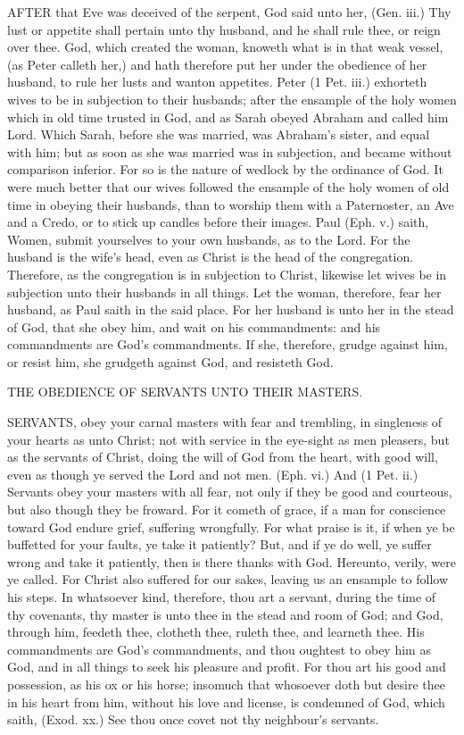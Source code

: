 AFTER that Eve was deceived of the serpent, God said 
unto her, (Gen. iii.) Thy lust or appetite shall pertain 
unto thy husband, and he shall rule thee, or reign over
thee. God, which created the woman, knoweth what is
in that weak vessel, (as Peter calleth her,) and hath therefore
put her under the obedience of her husband, to rule her 
lusts and wanton appetites. Peter (1 Pet. iii.) exhorteth 
wives to be in subjection to their husbands; after the ensample
of the holy women which in old time trusted in 
God, and as Sarah obeyed Abraham and called him 
Lord. Which Sarah, before she was married, was
Abraham's sister, and equal with him; but as 
soon as she was married was in subjection, and became 
without comparison inferior. For so is the nature of 
wedlock by the ordinance of God. It were much better 
that our wives followed the ensample of the holy women of 
old time in obeying their husbands, than to worship them 
with a Paternoster, an Ave and a Credo, or to stick up 
candles before their images. Paul (Eph. v.) saith, Women, 
submit yourselves to your own husbands, as to the
Lord. For the husband is the wife's head, even as Christ is 
the head of the congregation. Therefore, as the congregation 
is in subjection to Christ, likewise let wives be in subjection
unto their husbands in all things. Let the woman, 
therefore, fear her husband, as Paul saith in the said place. 
For her husband is unto her in the stead of God, that she 
obey him, and wait on his commandments: and his commandments
are God's commandments. If she, therefore, 
grudge against him, or resist him, she grudgeth against 
God, and resisteth God.


THE OBEDIENCE OF SERVANTS UNTO THEIR 
MASTERS. 

SERVANTS, obey your carnal masters with fear and 
trembling, in singleness of your hearts as unto Christ;
not with service in the eye-sight as men pleasers, but as 
the servants of Christ, doing the will of God from the 
heart, with good will, even as though ye served the Lord 
and not men. (Eph. vi.) And (1 Pet. ii.) Servants obey 
your masters with all fear, not only if they be good and 
courteous, but also though they be froward. For it cometh 
of grace, if a man for conscience toward God endure 
grief, suffering wrongfully. For what praise is it, if when 
ye be buffetted for your faults, ye take it patiently? But, 
and if ye do well, ye suffer wrong and take it patiently, 
then is there thanks with God. Hereunto, verily, were ye 
called. For Christ also suffered for our sakes, leaving us 
an ensample to follow his steps. In whatsoever kind, therefore,
thou art a servant, during the time of thy covenants, 
thy master is unto thee in the stead and room of God;
and God, through him, feedeth thee, clotheth thee, ruleth 
thee, and learneth thee. His commandments are God's 
commandments, and thou oughtest to obey him as God, 
and in all things to seek his pleasure and profit. For 
thou art his good and possession, as his ox or his horse;
insomuch that whosoever doth but desire thee in his heart 
from him, without his love and license, is condemned of 
God, which saith, (Exod. xx.) See thou once covet not 
thy neighbour's servants. 

